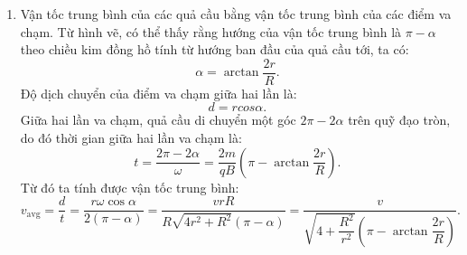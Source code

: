 \begin{loigiai}
\begin{enumerate}[1)]
\begin{center}
    \end{center}
    \item Vận tốc trung bình của các quả cầu bằng vận tốc trung bình của các điểm va chạm. Từ hình vẽ, có thể thấy rằng hướng của vận tốc trung bình là $\pi-\alpha$ theo chiều kim đồng hồ tính từ hướng ban đầu của quả cầu tới, ta có: $$\alpha=\arctan{\dfrac{2r}{R}}.$$
    Độ dịch chuyển của điểm va chạm giữa hai lần là:
    $$d=rcos\alpha.$$
    Giữa hai lần va chạm, quả cầu di chuyển một góc $2\pi-2\alpha$ trên quỹ đạo tròn, do đó thời gian giữa hai lần va chạm là:
    $$t=\dfrac{2\pi-2\alpha}{\omega}=\dfrac{2m}{qB}\left(\pi-\arctan{\dfrac{2r}{R}}\right).$$
    Từ đó ta tính được vận tốc trung bình:
    $$v_{\mathrm{avg}}=\dfrac{d}{t}=\dfrac{r\omega\cos\alpha}{2(\pi-\alpha)}=\dfrac{vrR}{R\sqrt{4r^2+R^2}(\pi-\alpha)}=\dfrac{v}{\sqrt{4+\dfrac{R^2}{r^2}}\left(\pi-\arctan{\dfrac{2r}{R}}\right)}.$$
\end{enumerate}
\end{loigiai}


